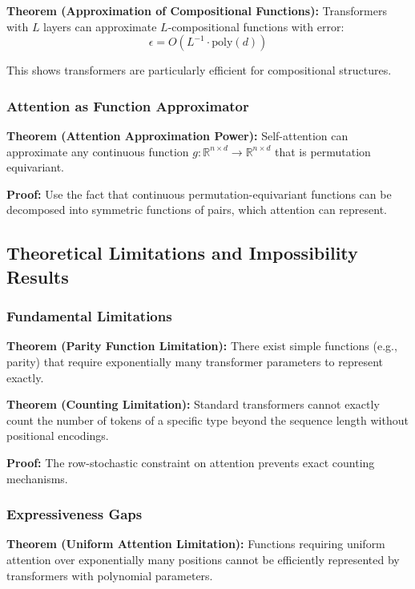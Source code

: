 \documentclass[11pt]{article}
\begin{document}
\textbf{Theorem (Approximation of Compositional Functions):} Transformers with $L$ layers can approximate $L$-compositional functions with error:
\begin{equation}
\epsilon = O(L^{-1} \cdot \text{poly}(d))
\end{equation}

This shows transformers are particularly efficient for compositional structures.

\subsubsection{Attention as Function Approximator}

\textbf{Theorem (Attention Approximation Power):} Self-attention can approximate any continuous function $g: \mathbb{R}^{n \times d} \rightarrow \mathbb{R}^{n \times d}$ that is permutation equivariant.

\textbf{Proof:} Use the fact that continuous permutation-equivariant functions can be decomposed into symmetric functions of pairs, which attention can represent.

\subsection{Theoretical Limitations and Impossibility Results}

\subsubsection{Fundamental Limitations}

\textbf{Theorem (Parity Function Limitation):} There exist simple functions (e.g., parity) that require exponentially many transformer parameters to represent exactly.

\textbf{Theorem (Counting Limitation):} Standard transformers cannot exactly count the number of tokens of a specific type beyond the sequence length without positional encodings.

\textbf{Proof:} The row-stochastic constraint on attention prevents exact counting mechanisms.

\subsubsection{Expressiveness Gaps}

\textbf{Theorem (Uniform Attention Limitation):} Functions requiring uniform attention over exponentially many positions cannot be efficiently represented by transformers with polynomial parameters.
\end{document}
